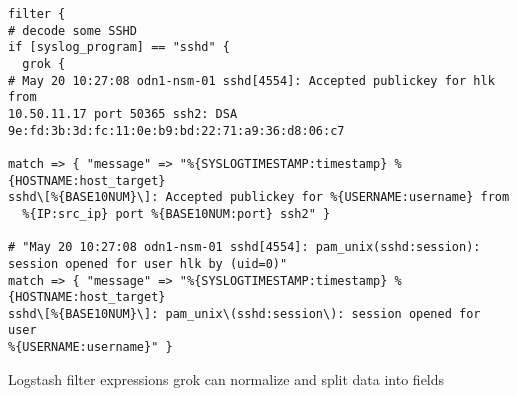 \documentclass[20pt,landscape,a4paper,footrule]{foils}
\begin{document}
{\footnotesize
\begin{verbatim}
filter {
# decode some SSHD
if [syslog_program] == "sshd" {
  grok {
# May 20 10:27:08 odn1-nsm-01 sshd[4554]: Accepted publickey for hlk from
10.50.11.17 port 50365 ssh2: DSA 9e:fd:3b:3d:fc:11:0e:b9:bd:22:71:a9:36:d8:06:c7

match => { "message" => "%{SYSLOGTIMESTAMP:timestamp} %{HOSTNAME:host_target}
sshd\[%{BASE10NUM}\]: Accepted publickey for %{USERNAME:username} from
  %{IP:src_ip} port %{BASE10NUM:port} ssh2" }

# "May 20 10:27:08 odn1-nsm-01 sshd[4554]: pam_unix(sshd:session):
session opened for user hlk by (uid=0)"
match => { "message" => "%{SYSLOGTIMESTAMP:timestamp} %{HOSTNAME:host_target}
sshd\[%{BASE10NUM}\]: pam_unix\(sshd:session\): session opened for user
%{USERNAME:username}" }
\end{verbatim}
}

\begin{list2}
\item Logstash filter expressions grok can normalize and split data into fields
\end{list2}



\myquestionspage





\end{document}
